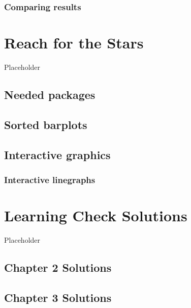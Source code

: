 \documentclass[12pt, krantz2,]{krantz}
\begin{document}
\hypertarget{comparing-results-4}{%
\subsection{Comparing results}\label{comparing-results-4}}

\hypertarget{appendixC}{%
\chapter{Reach for the Stars}\label{appendixC}}

Placeholder

\hypertarget{needed-packages-11}{%
\section*{Needed packages}\label{needed-packages-11}}


\hypertarget{sorted-barplots}{%
\section{Sorted barplots}\label{sorted-barplots}}

\hypertarget{interactive-graphics}{%
\section{Interactive graphics}\label{interactive-graphics}}

\hypertarget{interactive-linegraphs}{%
\subsection{Interactive linegraphs}\label{interactive-linegraphs}}

\hypertarget{appendixD}{%
\chapter{Learning Check Solutions}\label{appendixD}}

Placeholder

\hypertarget{chapter-2-solutions}{%
\section{Chapter 2 Solutions}\label{chapter-2-solutions}}

\hypertarget{chapter-3-solutions}{%
\section{Chapter 3 Solutions}\label{chapter-3-solutions}}
\end{document}
